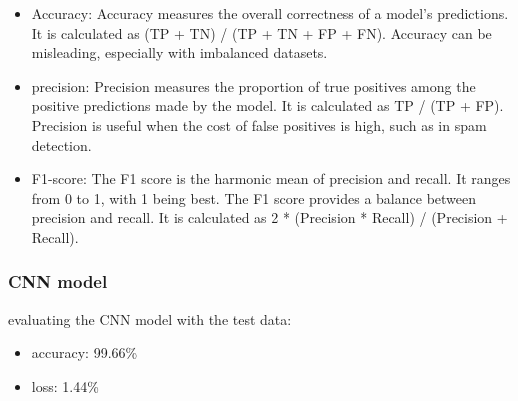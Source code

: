 \begin{itemize}
	\item Accuracy: Accuracy measures the overall correctness of a model's predictions. It is calculated as (TP + TN) / (TP + TN + FP + FN). Accuracy can be misleading, especially with imbalanced datasets.
	\item precision: Precision measures the proportion of true positives among the positive predictions made by the model. It is calculated as TP / (TP + FP). Precision is useful when the cost of false positives is high, such as in spam detection.
	\item F1-score: The F1 score is the harmonic mean of precision and recall. It ranges from 0 to 1, with 1 being best. The F1 score provides a balance between precision and recall. It is calculated as 2 * (Precision * Recall) / (Precision + Recall).
\end{itemize}

\subsubsection{CNN model}
evaluating the CNN model with the test data:
\firmlist
		\begin{itemize}
			\item accuracy: 99.66\%
			\item loss: 1.44\%
		\end{itemize}



